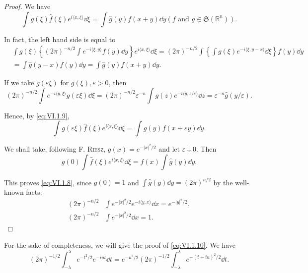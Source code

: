 \begin{proof}
 We have 
\begin{equation}\label{eq:VI.1.9}
\int g (\xi) \hat {f} (\xi) e ^{i \langle x, \xi \rangle} \dd \xi = \int \hat {g} (y) f (x + y) \dd y (f \text{ and } g \in \mathfrak {S} (\mathbb{R}^{n})). \end{equation}

In fact, the left hand side is equal to 
\[
\begin{aligned}
&\int g (\xi) \left\{(2 \pi) ^{-n/2} \int e ^{- i \langle \xi , y \rangle} f (y) \dd y \right\} e ^{i \langle x, \xi \rangle} \dd \xi = (2 \pi) ^{-n/2} \int \left\{\int g (\xi) e ^{- i \langle \xi , y - x \rangle} \dd \xi \right\} f (y) \dd y
\\
&= \int \hat {g} (y - x) f (y) \dd y = \int \hat {g} (y) f (x + y) \dd y.
\end{aligned}
\]

If we take $g(\varepsilon \xi)$ for $g(\xi), \varepsilon > 0$, then 
\[
(2 \pi) ^{-n/2} \int e ^{- i \langle y, \xi \rangle} g (\varepsilon \xi) \dd \xi = (2 \pi) ^{-n/2} \varepsilon^{-n} \int g (z) e ^{- i \langle y, z / \varepsilon \rangle} \dd z = \varepsilon^{-n} \hat {g} (y / \varepsilon).
\]

Hence, by \eqref{eq:VI.1.9}, 
\[
\int g (\varepsilon \xi) \hat {f} (\xi) e ^{i \langle x, \xi \rangle} \dd \xi = \int \hat {g} (y) f (x + \varepsilon y) \dd y.
\]

We shall take, following F. \textsc{Riesz}, $g(x) = e^{-|x|^2/2}$ and let $\varepsilon \downarrow 0$. Then 
\[
g (0) \int \hat {f} (\xi) e ^{i \langle x, \xi \rangle} \dd \xi = f (x) \int \hat {g} (y) \dd y.
\]

This proves \eqref{eq:VI.1.8}, since $g(0) = 1$ and $\int \hat{g}(y) \dd y = (2\pi)^{n/2}$ by the well-known facts: 
\begin{align}
(2 \pi) ^{-n/2}& \int e ^ {- | x | ^{2} / 2} e ^{- i \langle y, x \rangle} \dd x = e ^ {- | y | ^{2} / 2}, \label{eq:VI.1.10} \\
(2 \pi) ^{-n/2}& \int e ^ {- | x | ^{2} / 2} \dd x = 1. \tag{10'}\label{eq:VI.1.10'}
\end{align}
\end{proof}


\begin{remarku} For the sake of completeness, we will give the proof of \eqref{eq:VI.1.10}. We have 
\[
(2 \pi) ^{-1/2} \int_{- \lambda} ^{\lambda} e ^ {- t ^{2} / 2} e ^{-iut} \dd t = e ^ {- u ^{2} / 2} (2 \pi) ^{-1/2} \int_{- \lambda} ^{\lambda} e ^ {- (t + i u) ^{2} / 2} \dd t.
\]
\end{remarku}

